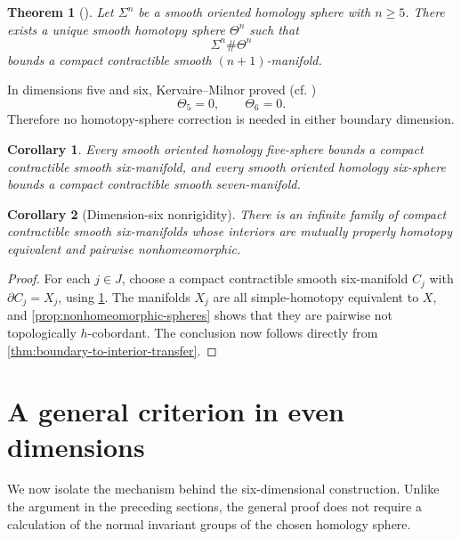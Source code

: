\documentclass[10pt,reqno]{amsart}
\numberwithin{equation}{section}
\newtheorem{theorem}{Theorem}
\newtheorem{corollary}{Corollary}
\theoremstyle{definition}
\theoremstyle{remark}
\begin{document}
\begin{theorem}[{\cite[Theorem 3]{KervaireHomologySpheres}}]\label{thm:kervaire-filling}
Let \(\Sigma^n\) be a smooth oriented homology sphere with \(n\geq5\).
There exists a unique smooth homotopy sphere \(\Theta^n\) such that
\[
\Sigma^n\#\Theta^n
\]
bounds a compact contractible smooth \((n+1)\)-manifold.
\end{theorem}

In dimensions five and six, Kervaire--Milnor proved
(cf. \cite{KervaireMilnor})
\[
\Theta_5=0,
\qquad
\Theta_6=0.
\]
Therefore no homotopy-sphere correction is needed in either boundary
dimension.

\begin{corollary}\label{cor:all-bound}
Every smooth oriented homology five-sphere bounds a compact
contractible smooth six-manifold, and every smooth oriented homology
six-sphere bounds a compact contractible smooth seven-manifold.
\end{corollary}

\begin{corollary}[Dimension-six nonrigidity]
\label{cor:dimension-six}
There is an infinite family of compact contractible smooth
six-manifolds whose interiors are mutually properly homotopy equivalent
and pairwise nonhomeomorphic.
\end{corollary}

\begin{proof}
For each \(j\in J\), choose a compact contractible smooth
six-manifold \(C_j\) with \(\partial C_j=X_j\), using
\cref{cor:all-bound}.  The manifolds \(X_j\) are all
simple-homotopy equivalent to \(X\), and
\cref{prop:nonhomeomorphic-spheres} shows that they are pairwise not
topologically \(h\)-cobordant.  The conclusion now follows directly
from \cref{thm:boundary-to-interior-transfer}.
\end{proof}

\section{A general criterion in even dimensions}
\label{sec:general-even-criterion}

We now isolate the mechanism behind the six-dimensional construction.
Unlike the argument in the preceding sections, the general proof does
not require a calculation of the normal invariant groups of the
chosen homology sphere.
\end{document}
